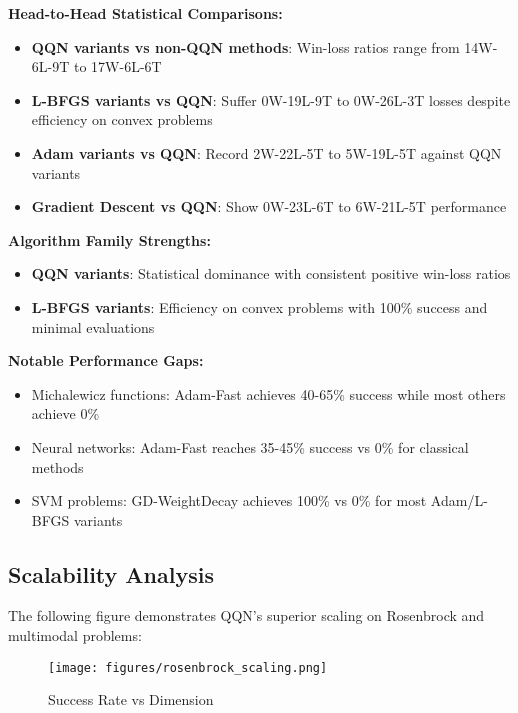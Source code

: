 \textbf{Head-to-Head Statistical Comparisons:}

\begin{itemize}
\tightlist
\item
  \textbf{QQN variants vs non-QQN methods}: Win-loss ratios range from 14W-6L-9T to 17W-6L-6T
\item
  \textbf{L-BFGS variants vs QQN}: Suffer 0W-19L-9T to 0W-26L-3T losses despite efficiency on convex problems
\item
  \textbf{Adam variants vs QQN}: Record 2W-22L-5T to 5W-19L-5T against QQN variants
\item
  \textbf{Gradient Descent vs QQN}: Show 0W-23L-6T to 6W-21L-5T performance
\end{itemize}

\textbf{Algorithm Family Strengths:}

\begin{itemize}
\tightlist
\item
  \textbf{QQN variants}: Statistical dominance with consistent positive win-loss ratios
\item
  \textbf{L-BFGS variants}: Efficiency on convex problems with 100\% success and minimal evaluations
\end{itemize}

\textbf{Notable Performance Gaps:}

\begin{itemize}
\tightlist
\item
  Michalewicz functions: Adam-Fast achieves 40-65\% success while most others achieve 0\%
\item
  Neural networks: Adam-Fast reaches 35-45\% success vs 0\% for classical methods
\item
  SVM problems: GD-WeightDecay achieves 100\% vs 0\% for most Adam/L-BFGS variants
\end{itemize}

\hypertarget{scalability-analysis}{%
\subsection{Scalability Analysis}\label{scalability-analysis}}

The following figure demonstrates QQN's superior scaling on Rosenbrock and multimodal problems:

\begin{figure}
\centering
\texttt{[image: figures/rosenbrock\_scaling.png]}
\caption{Success Rate vs Dimension}
\end{figure}

